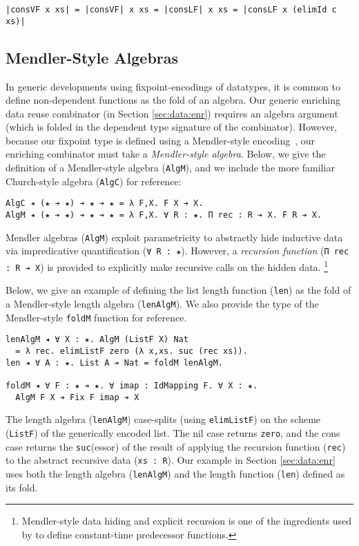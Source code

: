 \documentclass[acmsmall]{acmart}\settopmatter{}
\newcommand{\refsec}[1]{Section \ref{sec:#1}}
\newcommand{\labsec}[1]{\label{sec:#1}}
\begin{document}
\begin{verbatim}
|consVF x xs| = |consVF| x xs = |consLF| x xs = |consLF x (elimId c xs)|
\end{verbatim}

\subsection{Mendler-Style Algebras}
\labsec{data:mendler}

In generic developments using fixpoint-encodings of datatypes, it is
common to define non-dependent functions as the fold of an algebra.
Our generic enriching data reuse combinator (in \refsec{data:enr})
requires an algebra argument (which is folded in the dependent type signature of
the combinator). However, because our fixpoint type is defined
using a Mendler-style encoding~\cite{firsov18b}, our enriching combinator
must take a \textit{Mendler-style algebra}. Below, we give the definition of
a Mendler-style algebra (\verb;AlgM;), and we include the more familiar
Church-style algebra (\verb;AlgC;) for reference:

\begin{verbatim}
AlgC ◂ (★ ➔ ★) ➔ ★ ➔ ★ = λ F,X. F X ➔ X.
AlgM ◂ (★ ➔ ★) ➔ ★ ➔ ★ = λ F,X. ∀ R : ★. Π rec : R ➔ X. F R ➔ X.
\end{verbatim}
Mendler algebras (\verb;AlgM;) exploit parametricity to abstractly
hide inductive data via impredicative quantification
(\verb;∀ R : ★;). However, a \textit{recursion function}
(\verb;Π rec : R ➔ X;) is provided to explicitly make recursive calls
on the hidden data. \footnote{
  Mendler-style data hiding and explicit recursion is one of the
  ingredients used by \cite{firsov18b} to define constant-time
  predecessor functions.
}

Below, we give an example of defining the list length function
(\verb;len;) as the fold of a Mendler-style length algebra
(\verb;lenAlgM;). We also provide the type of the Mendler-style
\verb;foldM; function for reference.

\begin{verbatim}
lenAlgM ◂ ∀ X : ★. AlgM (ListF X) Nat
  = λ rec. elimListF zero (λ x,xs. suc (rec xs)).
len ◂ ∀ A : ★. List A ➔ Nat = foldM lenAlgM.

foldM ◂ ∀ F : ★ ➔ ★. ∀ imap : IdMapping F. ∀ X : ★. 
  AlgM F X ➔ Fix F imap ➔ X
\end{verbatim}
The length algebra (\verb;lenAlgM;) case-splits (using
\verb;elimListF;) on the scheme (\verb;ListF;) of the generically
encoded list. The nil case returns \verb;zero;, and the cons case
returns the \verb;suc;(essor) of the result of applying the recursion
function (\verb;rec;) to the abstract recursive data (\verb;xs : R;).
Our example in \refsec{data:enr} uses both the
length algebra (\verb;lenAlgM;) and the
length function (\verb;len;) defined as its fold.
\end{document}

